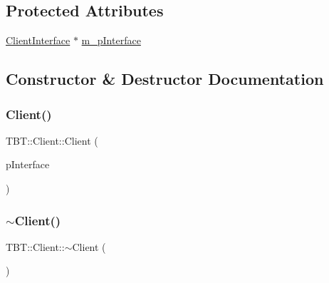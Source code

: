 \subsection*{Protected Attributes}
\begin{DoxyCompactItemize}
\item 
\hyperlink{classTBT_1_1ClientInterface}{Client\+Interface} $\ast$ \hyperlink{classTBT_1_1Client_a0b3e41f73f6381600c8ddac129b740f6_a0b3e41f73f6381600c8ddac129b740f6}{m\+\_\+p\+Interface}
\end{DoxyCompactItemize}


\subsection{Constructor \& Destructor Documentation}
\mbox{\label{classTBT_1_1Client_a6220a6ee1345c62986aea535e2ae202c_a6220a6ee1345c62986aea535e2ae202c}} 
\subsubsection{\texorpdfstring{Client()}{Client()}}
{\footnotesize\ttfamily T\+B\+T\+::\+Client\+::\+Client (\begin{DoxyParamCaption}\item[{\hyperlink{classTBT_1_1ClientInterface}{Client\+Interface} $\ast$}]{p\+Interface }\end{DoxyParamCaption})}

\mbox{\label{classTBT_1_1Client_a34eb45b19974601b60d074ef8baf74ad_a34eb45b19974601b60d074ef8baf74ad}} 
\subsubsection{\texorpdfstring{$\sim$\+Client()}{~Client()}}
{\footnotesize\ttfamily T\+B\+T\+::\+Client\+::$\sim$\+Client (\begin{DoxyParamCaption}{ }\end{DoxyParamCaption})\hspace{0.3cm}{\ttfamily [virtual]}}



